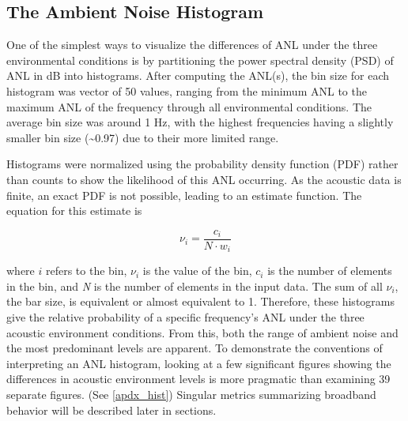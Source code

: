 \subsection{The Ambient Noise Histogram} \label{sec_hist}

One of the simplest ways to visualize the differences of ANL under the three environmental conditions is by partitioning the power spectral density (PSD) of ANL in dB into histograms. After computing the ANL(s), the bin size for each histogram was vector of 50 values, ranging from the minimum ANL to the maximum ANL of the frequency through all environmental conditions. The average bin size was around 1 Hz, with the highest frequencies having a slightly smaller bin size (\textasciitilde 0.97) due to their more limited range. %

Histograms were normalized using the probability density function (PDF) rather than counts to show the likelihood of this ANL occurring. As the acoustic data is finite, an exact PDF is not possible, leading to an estimate function. The equation for this estimate is

\begin{equation} \label{eq:hist_pdf}
 \nu _{i}=\frac{c_{i}}{N \cdot w_{i}} 
\end{equation}

where $i$ refers to the bin, $\nu _{i}$ is the value of the bin, $c_{i}$ is the number of elements in the bin, and \textit{N} is the number of elements in the input data. The sum of all $\nu_{i}$, the bar size, is equivalent or almost equivalent to 1. Therefore, these histograms give the relative probability  of a specific frequency's ANL under the three acoustic environment conditions. From this, both the range of ambient noise and the most predominant levels are apparent. To demonstrate the conventions of interpreting an ANL histogram, looking at a few significant figures showing the differences in acoustic environment levels is more pragmatic than examining 39 separate figures. (See \autoref{apdx_hist}) Singular metrics summarizing broadband behavior will be described later in sections.

